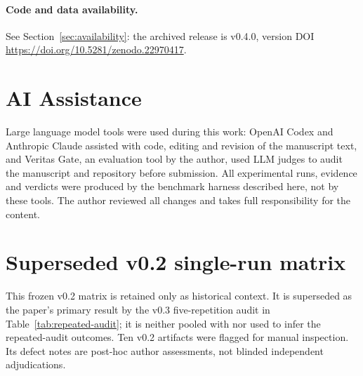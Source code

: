 \documentclass[11pt]{article}
\begin{document}
\paragraph{Code and data availability.} See Section~\ref{sec:availability}:
the archived release is v0.4.0, version DOI \url{https://doi.org/10.5281/zenodo.22970417}.

\section*{AI Assistance}

Large language model tools were used during this work: OpenAI Codex and
Anthropic Claude assisted with code, editing and revision of the manuscript
text, and Veritas Gate, an evaluation tool by the author, used LLM judges to
audit the manuscript and repository before submission. All experimental runs,
evidence and verdicts were produced by the benchmark harness described here,
not by these tools. The author reviewed all changes and takes full
responsibility for the content.

\appendix
\section{Superseded v0.2 single-run matrix}
\label{app:v02-matrix}

This frozen v0.2 matrix is retained only as historical context. It is
superseded as the paper's primary result by the v0.3 five-repetition audit in
Table~\ref{tab:repeated-audit}; it is neither pooled with nor used to infer
the repeated-audit outcomes. Ten v0.2 artifacts were flagged for manual
inspection. Its defect notes are post-hoc author assessments, not blinded
independent adjudications.
\end{document}
